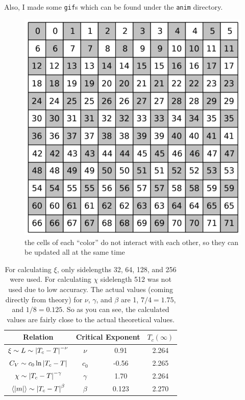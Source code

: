 \documentclass[12pt,a4paper]{article}
\begin{document}
	Also, I made some \texttt{gif}s which can be found under the \texttt{anim} directory.
	\begin{figure}
		\centering
		\includegraphics[width=0.8\linewidth]{checkerboard.png}
		\caption{the cells of each \enquote{color} do not interact with each other, so they can be updated all
			at the same time}
		\label{fig:checkerboard}
	\end{figure}
	\begin{table}
		\centering
		\caption{For calculating $\xi$, only sidelengths 32, 64, 128, and 256 were used. For calculating $\chi$
			sidelength 512 was not used due to low accuracy. The actual values (coming directly from theory)
			for $\nu$, $\gamma$, and $\beta$ are 1, $7/4=1.75$, and $1/8=0.125$. So as you can see, the calculated
			values are fairly close to the actual theoretical values.}
		\begin{tabular}{|c|c|c|c|}
			\hline
			Relation & \multicolumn{2}{|c|}{Critical Exponent} & $T_c(\infty)$ \\
			\hline
			$\xi\sim L\sim \abs{T_c-T}^{-\nu}$ & $\nu$ & 0.91 & 2.264 \\
			$C_V\sim c_0\ln{\abs{T_c-T}}$ & $c_0$ & -0.56 & 2.265 \\
			$\chi\sim\abs{T_c-T}^{-\gamma}$ & $\gamma$ & 1.70 & 2.264 \\
			$\expval{\abs{m}}\sim\abs{T_c-T}^{\beta}$ & $\beta$ & 0.123 & 2.270 \\
			\hline
		\end{tabular}
	\end{table}
\end{document}
